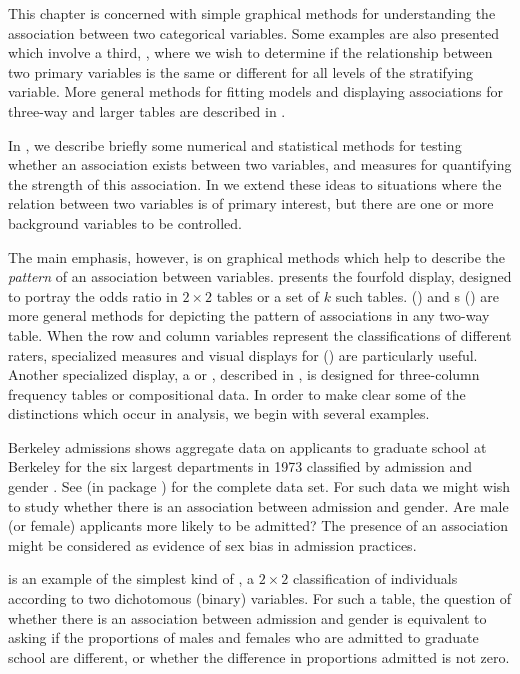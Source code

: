 \documentclass[10pt,krantz2]{krantz}\usepackage[]{graphicx}\usepackage[]{color}
\begin{document}
This chapter is concerned with simple graphical methods for understanding the association
between two categorical variables.
Some examples are also presented which involve a third, ,
where we wish to determine if the relationship between two primary
variables is the same or different for all levels of the
stratifying variable.
More general methods for fitting models and displaying associations for three-way
and larger tables are described in .

In , we describe briefly some numerical
and statistical
methods for testing whether an association
exists between two variables,  and measures
for quantifying the strength
of this association.
In  we extend these ideas to situations where
the relation between two variables is of primary interest, but there
are one or more background variables to be controlled.

The main emphasis, however, is on graphical methods which help
to describe the \emph{pattern} of an association between variables.
 presents the fourfold display,
designed to portray the odds ratio in $2 \times 2$ tables or a set
of $k$ such tables.
() and s
() are more general methods for depicting
the pattern of associations in any two-way table.
When the row and column variables represent the classifications
of different raters, specialized measures and visual displays
for  () are particularly
useful.
Another specialized display, a  or ,
described in ,
is designed
for three-column frequency tables or compositional data.
In order to make clear some of the distinctions which occur in
\ctab analysis, we begin with several examples.

\begin{Example}[berkeley1]{Berkeley admissions}
 shows aggregate data on applicants to
graduate school at Berkeley for the six largest departments in 1973
classified by admission and gender
\citep{Bickel-etal:75}.
See  (in package ) for the complete data set.
For such data we might wish to study whether there is an association
between admission and gender.
Are male (or female) applicants more likely to be admitted?
The presence of an association might be considered as
evidence of sex bias in admission practices.

 is an example of the simplest kind of \ctab,
a $2 \times 2$ classification of individuals according to two
dichotomous (binary) variables.
For such a table, the question of whether there is an association
between admission and gender is equivalent to asking if the
proportions of males and females who are admitted to graduate
school are different, or whether the difference in proportions
admitted is not zero.

\end{Example}
\end{document}
